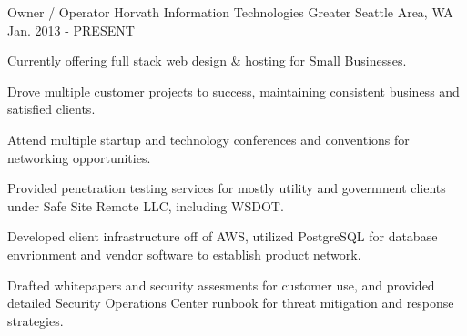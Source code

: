 


\begin{cventries}


\cventry
{Owner / Operator} %
{Horvath Information Technologies} %
{Greater Seattle Area, WA} %
{Jan. 2013 - PRESENT} %
{ %
\begin{cvitems}
\item {Currently offering full stack web design \& hosting for Small Businesses.}
\item {Drove multiple customer projects to success, maintaining consistent business and satisfied clients.}
\item {Attend multiple startup and technology conferences and conventions for networking opportunities.}
\item {Provided penetration testing services for mostly utility and government clients under Safe Site Remote LLC, including WSDOT.}
\item {Developed client infrastructure off of AWS, utilized PostgreSQL for database envrionment and vendor software to establish product network.}
\item {Drafted whitepapers and security assesments for customer use, and provided detailed Security Operations Center runbook for threat mitigation and response strategies.}
\end{cvitems}
}



\end{cventries}